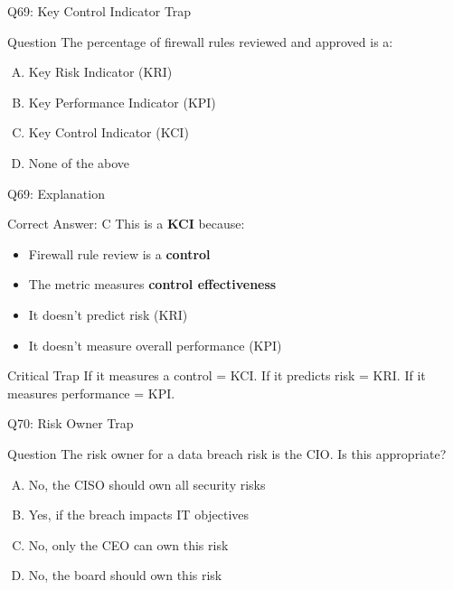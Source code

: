 \documentclass{beamer}
\begin{document}
	\begin{frame}{Q69: Key Control Indicator Trap}
		\begin{block}{Question}
			The percentage of firewall rules reviewed and approved is a:
		\end{block}
		\begin{enumerate}[(A)]
			\item Key Risk Indicator (KRI)
			\item Key Performance Indicator (KPI)
			\item Key Control Indicator (KCI)
			\item None of the above
		\end{enumerate}
	\end{frame}
	
	\begin{frame}{Q69: Explanation}
		\begin{block}{Correct Answer: C}
			This is a \textbf{KCI} because:
			\begin{itemize}
				\item Firewall rule review is a \textbf{control}
				\item The metric measures \textbf{control effectiveness}
				\item It doesn't predict risk (KRI)
				\item It doesn't measure overall performance (KPI)
			\end{itemize}
		\end{block}
		\begin{alertblock}{Critical Trap}
			If it measures a control = KCI.
			If it predicts risk = KRI.
			If it measures performance = KPI.
		\end{alertblock}
	\end{frame}
	
	\begin{frame}{Q70: Risk Owner Trap}
		\begin{block}{Question}
			The risk owner for a data breach risk is the CIO. Is this appropriate?
		\end{block}
		\begin{enumerate}[(A)]
			\item No, the CISO should own all security risks
			\item Yes, if the breach impacts IT objectives
			\item No, only the CEO can own this risk
			\item No, the board should own this risk
		\end{enumerate}
	\end{frame}
	
\end{document}
